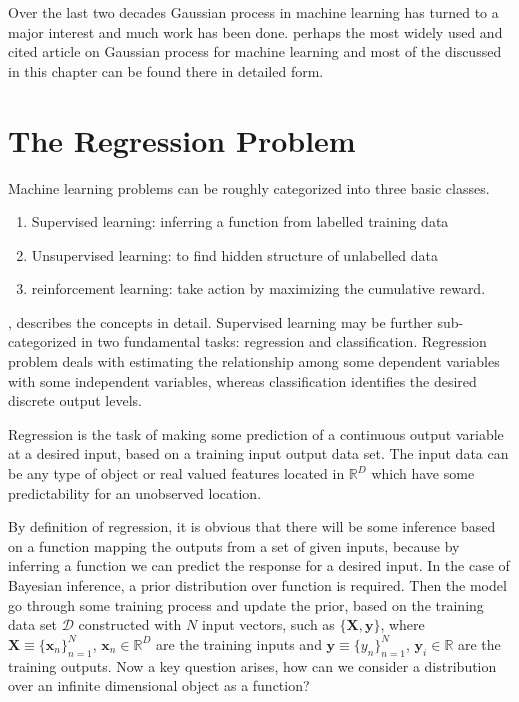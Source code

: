 Over the last two decades Gaussian process in machine learning has turned to a major interest
and much work has been done. \cite{Rasmussen_and_Williams:2006} perhaps the most widely used and 
cited article on Gaussian process for machine learning and most of the discussed in this chapter 
can be found there in detailed form.


\section{The Regression Problem}
Machine learning problems can be roughly categorized into three basic classes. 
\begin{enumerate}
 \item Supervised learning: inferring a function from labelled training data
 \item Unsupervised learning: to find hidden structure of unlabelled data 
 \item reinforcement learning: take action by maximizing the cumulative reward. 
\end{enumerate}
\cite{MacKay:2003}, \cite{Bishop:2006} describes the concepts in detail.
Supervised learning may be further sub-categorized in two fundamental tasks: regression and 
classification. Regression problem deals with estimating the relationship among some dependent
variables with some independent variables, whereas classification identifies the desired 
discrete output levels.

Regression is the task of making some prediction of a continuous output variable at a desired
input, based on a training input output data set. The input data can be any type of 
object or real valued features located in $\mathbb{R}^D$ which have some predictability 
for an unobserved location. 

By definition of regression, it is obvious that there will be some inference based on a function
mapping the outputs from a set of given inputs, because by inferring a function we can predict 
the response for a desired input. In the case of Bayesian inference, a prior distribution 
over function is required. Then the model go through some training process and update the prior, 
based on the training data set $\mathcal{D}$ constructed with $N$ input vectors, such as
$\{\textbf{X},\textbf{y}\}$, 
where $\textbf{X}\equiv{\{{\textbf{x}_n}\}_{n=1}^N}$, $ \textbf{x}_n\in\mathbb{R}^D $ 
are the training inputs and 
$\textbf{y}\equiv{\{{y_n}\}_{n=1}^N}$, $ \textbf{y}_i\in\mathbb{R}$
are the training outputs. Now a key question arises, how can we consider a distribution
over an infinite dimensional object as a function?

